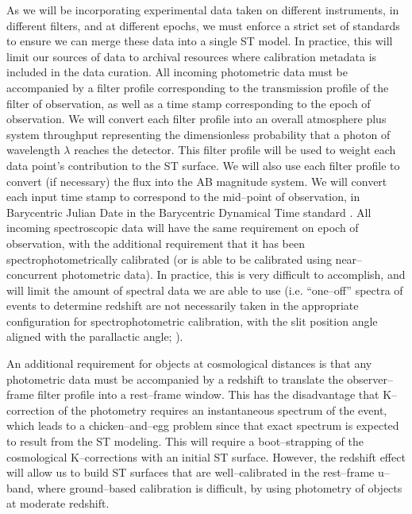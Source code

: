 As we will be incorporating experimental data taken on different instruments, in
different filters, and at different epochs, we must enforce a strict set of
standards to ensure we can merge these data into a single ST model. In practice,
this will limit our sources of data to archival resources where calibration
metadata is included in the data curation. All incoming photometric data must be
accompanied by a filter profile corresponding to the transmission profile of the
filter of observation, as well as a time stamp corresponding to the epoch of
observation.  We will convert each filter profile into an overall atmosphere
plus system throughput representing the dimensionless probability that a photon
of wavelength $\lambda$ reaches the detector.  This filter profile will be used
to weight each data point's contribution to the ST surface.  We will also use
each filter profile to convert (if necessary) the flux into the AB magnitude
system.  We will convert each input time stamp to correspond to the mid--point
of observation, in Barycentric Julian Date in the Barycentric Dynamical Time
standard \citep{2010PASP..122..935E}. All incoming spectroscopic data will have
the same requirement on epoch of observation, with the additional requirement
that it has been spectrophotometrically calibrated (or is able to be calibrated
using near--concurrent photometric data).  In practice, this is very difficult
to accomplish, and will limit the amount of spectral data we are able to use
(i.e. ``one--off'' spectra of events to determine redshift are not necessarily
taken in the appropriate configuration for spectrophotometric calibration, with
the slit position angle aligned with the parallactic angle;
\citealt{1982PASP...94..715F}).

An additional requirement for objects at cosmological distances is that any
photometric data must be accompanied by a redshift to translate the
observer--frame filter profile into a rest--frame window. This has the
disadvantage that K--correction of the photometry \citep{2002astro.ph.10394H}
requires an instantaneous spectrum of the event, which leads to a
chicken--and--egg problem since that exact spectrum is expected to result from
the ST modeling.  This will require a boot--strapping of the cosmological
K--corrections with an initial ST surface.  However, the redshift effect will
allow us to build ST surfaces that are well--calibrated in the rest--frame
u--band, where ground--based calibration is difficult, by using photometry of
objects at moderate redshift.


